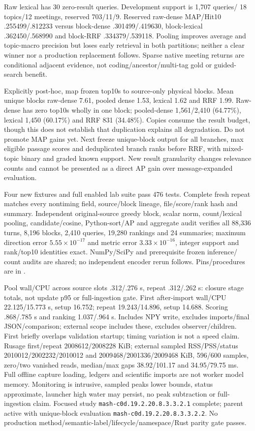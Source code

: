 \documentclass[11pt]{article}
\begin{document}
Raw lexical has 30 zero-result queries. Development support is 1,707 queries/
18 topics/12 meetings, reserved 703/11/9. Reserved raw-dense MAP/Hit10
.255499/.812233 versus block-dense .301499/.419630, block-lexical .362450/.568990
and block-RRF .334379/.539118. Pooling improves average and topic-macro precision
but loses early retrieval in both partitions; neither a clear winner nor a
production replacement follows. Sparse native meeting returns are conditional
adjacent evidence, not coding/ancestor/multi-tag gold or guided-search benefit.

Explicitly post-hoc, map frozen top10s to source-only physical blocks. Mean unique
blocks raw-dense 7.61, pooled dense 1.53, lexical 1.62 and RRF 1.99. Raw-dense
has zero top10s wholly in one block; pooled-dense 1,561/2,410 (64.77\%), lexical
1,450 (60.17\%) and RRF 831 (34.48\%). Copies consume the result budget, though
this does not establish that duplication explains all degradation. Do not promote
MAP gains yet. Next freeze unique-block output for all branches, max eligible
passage scores and deduplicated branch ranks before RRF, with mixed-topic binary
and graded known support. New result granularity changes relevance counts and
cannot be presented as a direct AP gain over message-expanded evaluation.

Four new fixtures and full enabled lab suite pass 476 tests. Complete fresh repeat
matches every nontiming field, source/block lineage, file/score/rank hash and summary.
Independent original-source greedy block, scalar norm, count/lexical pooling,
candidate/cosine, Python-sort/AP and aggregate audit verifies all 88,336 turns,
8,196 blocks, 2,410 queries, 19,280 rankings and 24 summaries; maximum direction
error $5.55\times10^{-17}$ and metric error $3.33\times10^{-16}$, integer support
and rank/top10 identities exact. NumPy/SciPy and prerequisite frozen inference/
count audits are shared; no independent encoder rerun follows. Pins/procedures are
in .

Pool wall/CPU across source slots .312/.276 s, repeat .312/.262 s: closure stage
totals, not update p95 or full-ingestion gate. First after-import wall/CPU
22.125/15.773 s, setup 16.752; repeat 19.243/14.896, setup 14.688. Scoring
.868/.785 s and ranking 1.037/.964 s. Includes NPY write, excludes imports/final
JSON/comparison; external scope includes these, excludes observer/children.
First briefly overlaps validation startup; timing variation is not a speed claim.
Rusage first/repeat 2008612/2008228 KiB; external sampled RSS/PSS/status
2010012/2002232/2010012 and 2009468/2001336/2009468 KiB, 596/600 samples,
zero/two vanished reads, median/max gaps 38.92/101.17 and 34.95/79.75 ms.
Full offline capture loading, ledgers and scientific imports are not worker model
memory. Monitoring is intrusive, sampled peaks lower bounds, status approximate,
launcher high water may persist, no peak subtraction or full-ingestion claim.
Focused study \texttt{mash-c0d.19.2.20.8.3.3.2.1} complete; parent active with
unique-block evaluation \texttt{mash-c0d.19.2.20.8.3.3.2.2}. No production
method/semantic-label/lifecycle/namespace/Rust parity gate passes.
\end{document}
